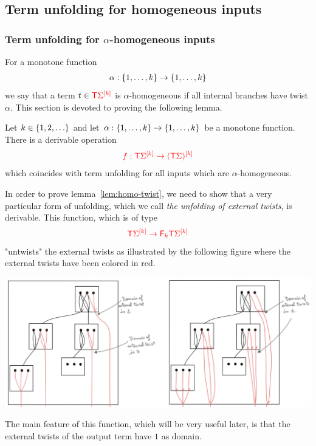 
\subsection{Term unfolding for homogeneous inputs}
\label{sec:homo-unfold}



\subsubsection{Term unfolding for $\alpha$-homogeneous inputs}
\label{subsec:alpha-homo-unfold}

For a monotone function 
\begin{align*}
\alpha: \set{1,\ldots,k} \to \set{1,\ldots,k}
\end{align*}
we say that a term $ t \in \tmonad \mati k \rSigma$ is $\alpha$-homogeneous if all internal branches have twist $\alpha$. This section is devoted to proving the following lemma. 

\begin{lemma}\label{lem:homo-twist}
    Let $k \in \set{1,2,\ldots}$ and let $\alpha : \set{1,\ldots,k} \to \set{1,\ldots,k}$ be a monotone function. There is a derivable operation 
    \begin{align*}
        \ranked{f : \tmonad \mati k \rSigma \to \mati k {(\tmonad \Sigma)} }
        \end{align*}      
which coincides with term unfolding for all inputs which are $\alpha$-homogeneous.
\end{lemma}

In order to prove lemma~\ref{lem:homo-twist}, we need to show that a very particular form of unfolding, which we call \emph{the unfolding of external twists}, is derivable. This function, which is of type 
\begin{align*}
\ranked{\tmonad \mati k \Sigma \to \reduce k \tmonad \mati k \Sigma}
\end{align*}
"untwists" the external twists  as illustrated by the following figure where the external twists have been colored in red. 
\begin{center}
\includegraphics[scale=.15]{MyPicExternalTwists.jpg}
\end{center}
The main feature of this function, which will be very useful later, is that the external twists of the output term have $1$ as domain.  


